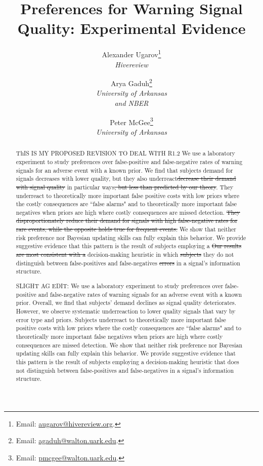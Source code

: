 \documentclass[12pt,a4paper]{article}
\title{\Large Preferences for Warning Signal Quality: Experimental Evidence\\}
\author{Alexander Ugarov\thanks{Email: \href{mailto:augarov@hivereview.org}{augarov@hivereview.org}.} \\
{\small \textit{Hivereview}}
\and Arya Gaduh\thanks{Email: \href{mailto:agaduh@walton.uark.edu}{agaduh@walton.uark.edu}.} \\
{\small \textit{University of Arkansas}}\\
{\small \textit{and NBER}} 
\and Peter McGee\thanks{Email: \href{mailto:pmcgee@walton.uark.edu}{pmcgee@walton.uark.edu}.} \\
{\small \textit{University of Arkansas}} 
}
\newcommand{\agt}[1]{{\color{OliveGreen}#1}}
\newcommand{\pmt}[1]{{\color{Blue}#1}}
\newcommand{\pmst}[1]{{\color{Blue}\st{#1}}}
\begin{document}
\maketitle
\onehalfspacing
\begin{abstract}{
\pmt{ThIS IS MY PROPOSED REVISION TO DEAL WITH R1.2}
\noindent We use a laboratory experiment to study preferences over false-positive and false-negative rates of warning signals for an adverse event with a known prior. We find that subjects demand for signals decreases with lower quality, but they also underreact\pmst{decrease their demand with signal quality} in particular ways\pmst{, but less than predicted by our theory}. They underreact to theoretically more important false positive costs with low priors where the costly consequences are ``false alarms" and to theoretically more important false negatives when priors are high where costly consequences are missed detection.  \pmst{They disproportionately reduce their demand for signals with high false-negative rates for rare events, while the opposite holds true for frequent events.} We show that neither risk preference nor Bayesian updating skills can fully explain this behavior. We provide suggestive evidence that this pattern is the result of subjects employing a \pmst{Our results are most consistent with a }decision-making heuristic in which \pmst{subjects} they do not distinguish between false-positives and false-negatives \pmst{errors} in a signal's information structure.


\agt{SLIGHT AG EDIT: We use a laboratory experiment to study preferences over false-positive and false-negative rates of warning signals for an adverse event with a known prior. Overall, we find that subjects' demand declines as signal quality deteriorates. However, we observe systematic underreaction to lower quality signals that vary by error type and priors. Subjects underreact to theoretically more important false positive costs with low priors where the costly consequences are ``false alarms" and to theoretically more important false negatives when priors are high where costly consequences are missed detection. We show that neither risk preference nor Bayesian updating skills can fully explain this behavior. We provide suggestive evidence that this pattern is the result of subjects employing a decision-making heuristic that does not distinguish between false-positives and false-negatives in a signal's information structure.}

}
\end{abstract}
\end{document}
